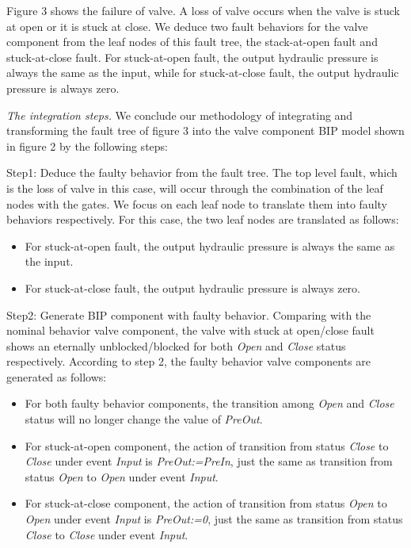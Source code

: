 \documentclass[conference]{IEEEtran}
\begin{document}
Figure 3 shows the failure of valve. A loss of valve occurs when the valve is stuck at open or it is stuck at close. We deduce two fault behaviors for the valve component from the leaf nodes of this fault tree, the stack-at-open fault and stuck-at-close fault. For stuck-at-open fault, the output hydraulic pressure is always the same as the input, while for stuck-at-close fault, the output hydraulic pressure is always zero.

\emph{The integration steps.} We conclude our methodology of integrating and transforming the fault tree of figure 3 into the valve component BIP model shown in figure 2 by the following steps:

Step1: Deduce the faulty behavior from the fault tree. The top level fault, which is the loss of valve in this case, will occur through the combination of the leaf nodes with the gates. We focus on each leaf node to translate them into faulty behaviors respectively. For this case, the two leaf nodes are translated as follows:

\begin{itemize}
	\item For stuck-at-open fault, the output hydraulic pressure is always the same as the input.
	\item For stuck-at-close fault, the output hydraulic pressure is always zero.
\end{itemize}

Step2: Generate BIP component with faulty behavior. Comparing with the nominal behavior valve component, the valve with stuck at open/close fault shows an eternally unblocked/blocked for both \emph{Open} and \emph{Close} status respectively. According to step 2, the faulty behavior valve components are generated as follows:

\begin{itemize}
	\item For both faulty behavior components, the transition among \emph{Open} and \emph{Close} status will no longer change the value of \emph{PreOut}.
	\item For stuck-at-open component, the action of transition from status \emph{Close} to \emph{Close} under event \emph{Input} is \emph{PreOut:=PreIn}, just the same as transition from status \emph{Open} to \emph{Open} under event \emph{Input}.
	\item For stuck-at-close component, the action of transition from status \emph{Open} to \emph{Open} under event \emph{Input} is \emph{PreOut:=0}, just the same as transition from status \emph{Close} to \emph{Close} under event \emph{Input}.
\end{itemize}
\end{document}
